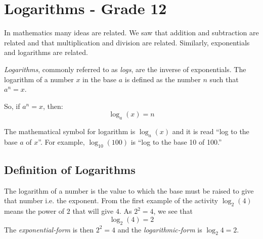 \chapter{Logarithms - Grade 12}
\label{m:f12:logarithms}


In mathematics many ideas are related. We saw that addition and subtraction are related and that multiplication and division are related. Similarly, exponentials and logarithms are related. 

\textit{Logarithms}, commonly referred to as \textit{logs}, are the inverse of exponentials. The logarithm of a number $x$ in the base $a$ is defined as the number $n$ such that $a^n = x$. 

So, if $a^n = x$, then:
\begin{equation}
\label{eq:mn:l}
\log_{a}(x) = n
\end{equation}


The mathematical symbol for logarithm is $\log_{a}(x)$ and it is read ``log to the base $a$ of $x$''. For example, $\log_{10}(100)$ is ``log to the base 10 of 100.''


\section{Definition of Logarithms}
The logarithm of a number is the value to which the base must be raised to give that number i.e. the exponent.  From the first example of the activity $\log_{2}(4)$ means the power of $2$ that will give $4$.  As $2^2=4$, we see that
\begin{equation} 
\log_{2}(4) = 2
\end{equation}
The \textit{exponential-form} is then $2^2 = 4$  and the \textit{logarithmic-form} is $\log_{2}4=2$.


